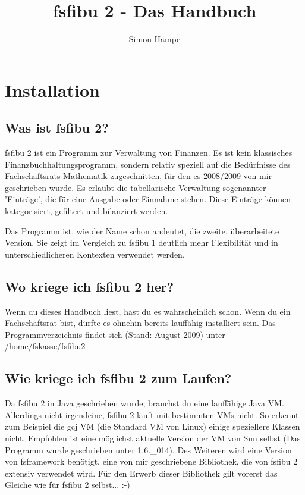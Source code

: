\documentclass[a4paper,10pt,halfparskip,oneside,smallheadings]{scrbook}
\title{fsfibu 2 - Das Handbuch}
\author{Simon Hampe}
\begin{document}
\maketitle
\tableofcontents

\chapter{Installation}

\section{Was ist fsfibu 2?}
fsfibu 2 ist ein Programm zur Verwaltung von Finanzen. Es ist kein klassisches Finanzbuchhaltungsprogramm, sondern
relativ speziell auf die Bedürfnisse des Fachschaftsrats Mathematik zugeschnitten, für den es 2008/2009 von mir
geschrieben wurde. Es erlaubt die tabellarische Verwaltung sogenannter 'Einträge', die für eine Ausgabe oder Einnahme stehen. Diese Einträge können kategorisiert, gefiltert und bilanziert werden. 

Das Programm ist, wie der Name schon andeutet, die zweite, überarbeitete Version. Sie zeigt im Vergleich zu fsfibu 1 deutlich mehr Flexibilität und in unterschiedlicheren Kontexten verwendet werden.

\section{Wo kriege ich fsfibu 2 her?}
Wenn du dieses Handbuch liest, hast du es wahrscheinlich schon. Wenn du ein Fachschaftsrat bist, dürfte es ohnehin
bereits lauffähig installiert sein. Das Programmverzeichnis findet sich (Stand: August 2009) unter /home/fskasse/fsfibu2

\section{Wie kriege ich fsfibu 2 zum Laufen?}
Da fsfibu 2 in Java geschrieben wurde, brauchst du eine lauffähige Java VM. Allerdings nicht irgendeine, fsfibu 2 läuft mit bestimmten VMs nicht. So erkennt zum Beispiel die gcj VM (die Standard VM von Linux) einige speziellere
Klassen nicht. Empfohlen ist eine möglichst aktuelle Version der VM von Sun selbst (Das Programm wurde geschrieben unter 1.6.\_014). Des Weiteren wird eine Version von fsframework benötigt, eine von mir geschriebene Bibliothek, die von fsfibu 2 extensiv verwendet wird. Für den Erwerb dieser Bibliothek gilt vorerst das Gleiche wie für fsfibu 2 selbst... :-)
\end{document}
